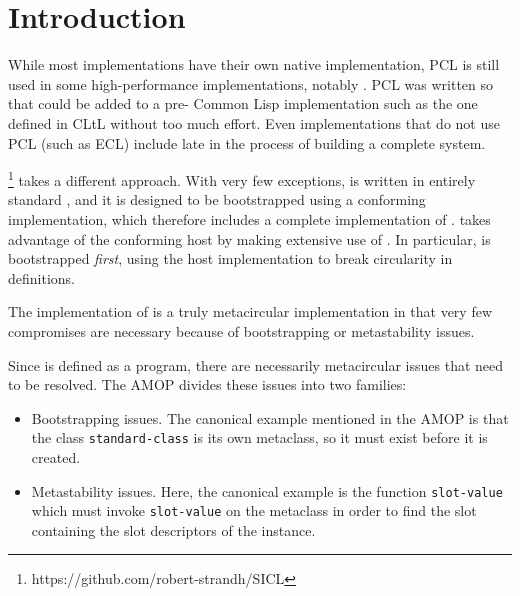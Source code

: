 \section{Introduction}

While most \cl{} implementations have their own native \clos{}
implementation, PCL \cite{Bobrow:1986:CML:28697.28700} is still used
in some high-performance implementations, notably \sbcl{}.  PCL was
written so that \clos{} could be added to a pre-\clos{} Common Lisp
implementation such as the one defined in CLtL \cite{Steele:1984:CLL}
without too much effort.  Even \cl{} implementations that do not use
PCL (such as ECL) include \clos{} late in the process of building a
complete system.

\sicl{}\footnote{https://github.com/robert-strandh/SICL} takes a
different approach.  With very few exceptions, \sicl{} is written in
entirely standard \cl{}, and it is designed to be bootstrapped using a
conforming \cl{} implementation, which therefore includes a complete
implementation of \clos{}.  \sicl{} takes advantage of the conforming
host by making extensive use of \clos{}.  In particular, \clos{} is
bootstrapped \emph{first}, using the host \clos{} implementation to
break circularity in definitions. 

The \sicl{} implementation of \clos{} is a truly metacircular
implementation in that very few compromises are necessary because of
bootstrapping or metastability issues.

Since \clos{} is defined as a \clos{} program, there are necessarily
metacircular issues that need to be resolved.  The AMOP
\cite{Kiczales:1991:AMP:574212} divides these issues into two
families:

\begin{itemize}
\item Bootstrapping issues.  The canonical example mentioned in the
  AMOP is that the class \texttt{standard-class} is its own metaclass,
  so it must exist before it is created.  
\item Metastability issues.  Here, the canonical example is the
  function \texttt{slot-value} which must invoke \texttt{slot-value}
  on the metaclass in order to find the slot containing the slot
  descriptors of the instance. 
\end{itemize}
